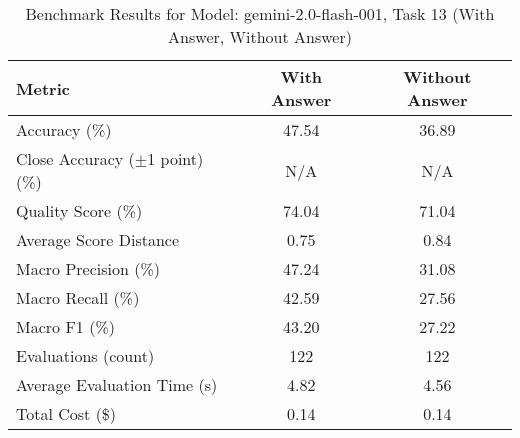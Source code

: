 \begin{table}[htbp]
\centering
\caption{Benchmark Results for Model: gemini-2.0-flash-001, Task 13 (With Answer, Without Answer)}
\begin{tabular}{lcc}
\toprule
\textbf{Metric} & \textbf{With Answer} & \textbf{Without Answer} \\
\midrule
Accuracy (\%) & 47.54 & 36.89 \\
Close Accuracy ($\pm$1 point) (\%) & N/A & N/A \\
Quality Score (\%) & 74.04 & 71.04 \\
Average Score Distance & 0.75 & 0.84 \\
Macro Precision (\%) & 47.24 & 31.08 \\
Macro Recall (\%) & 42.59 & 27.56 \\
Macro F1 (\%) & 43.20 & 27.22 \\
Evaluations (count) & 122 & 122 \\
Average Evaluation Time (s) & 4.82 & 4.56 \\
Total Cost (\$) & 0.14 & 0.14 \\
\bottomrule
\end{tabular}
\end{table}